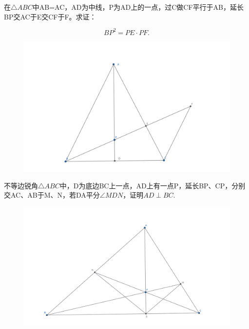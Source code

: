 \begin{exercise}
在$\triangle ABC$中AB=AC，AD为中线，P为AD上的一点，过C做CF平行于AB，延长BP交AC于E交CF于F。求证：

$$BP^2=PE\cdot PF.$$
\end{exercise}
\begin{figure}[H]
    \centering
    \includegraphics[width=0.7\linewidth]{figures/exercises/017.png}
\end{figure}


\begin{exercise}
不等边锐角$\triangle ABC$中，D为底边BC上一点，AD上有一点P，延长BP、CP，分别交AC、AB于M、N，若DA平分$\angle MDN$，证明$AD \perp BC.$
\end{exercise}
\begin{figure}[H]
    \centering
    \includegraphics[width=0.7\linewidth]{figures/exercises/018.png}
\end{figure}    